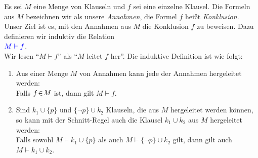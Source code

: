 \begin{Definition}
    Es sei $M$ eine Menge von Klauseln  und $f$ sei eine einzelne Klausel.  
    Die Formeln aus $M$ bezeichnen wir als unsere \emph{\color{blue}Annahmen}, die Formel
    $f$ hei{\ss}t \emph{\color{blue}Konklusion}.  Unser Ziel ist es, mit den Annahmen aus $M$
    die Konklusion $f$ zu beweisen.  Dazu definieren wir induktiv die Relation \\[0.2cm]
    \hspace*{1.3cm}
    ${\color{blue}M \vdash f}$. \\[0.2cm]
    Wir lesen ``$M \vdash f$'' als ``{\color{blue}$M$ leitet $f$ her}''.  Die induktive Definition ist
    wie folgt:
    \begin{enumerate}
    \item Aus einer Menge $M$ von Annahmen kann jede der Annahmen hergeleitet werden: \\[0.2cm]
          \hspace*{1.3cm} 
          Falls $f \!\in\! M$ ist, dann gilt  $M \vdash f$.
    \item Sind $k_1 \cup \{p\}$ und $\{ \neg p \} \cup k_2$ Klauseln, die aus $M$
          hergeleitet werden k\"{o}nnen, so kann mit der Schnitt-Regel auch die Klausel $k_1 \cup k_2$ aus $M$
          hergeleitet werden: \\[0.2cm]
          \hspace*{1.3cm} 
          Falls sowohl $M \vdash k_1 \cup \{p\}$ als auch $M \vdash \{ \neg p \} \cup k_2$
          gilt, dann gilt auch $M \vdash k_1 \cup k_2$.
    \eox
    \end{enumerate}
\end{Definition}



